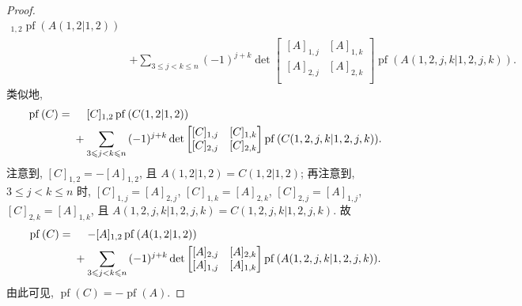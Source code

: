 \begin{proof}
\begin{align*}
        [A]_{1,2}
        \operatorname{pf} {(A({1,2}|{1,2}))}
        \\
             &
        +
        \sum_{3 \leq j < k \leq n}
        {
        (-1)^{j + k}
        \det {
            \begin{bmatrix}
                [A]_{1,j} & [A]_{1,k} \\
                [A]_{2,j} & [A]_{2,k} \\
            \end{bmatrix}
        }
        \operatorname{pf} {(A({1,2,j,k}|{1,2,j,k}))}
        }.
    \end{align*}
    类似地,
    \begin{align*}
        \operatorname{pf} {(C)}
        = {} &
        \hphantom{{} + {}}
        [C]_{1,2}
        \operatorname{pf} {(C({1,2}|{1,2}))}
        \\
             &
        +
        \sum_{3 \leq j < k \leq n}
        {
        (-1)^{j + k}
        \det {
            \begin{bmatrix}
                [C]_{1,j} & [C]_{1,k} \\
                [C]_{2,j} & [C]_{2,k} \\
            \end{bmatrix}
        }
        \operatorname{pf} {(C({1,2,j,k}|{1,2,j,k}))}
        }.
    \end{align*}
    注意到, \([C]_{1,2} = -[A]_{1,2}\),
    且 \(A({1,2}|{1,2}) = C({1,2}|{1,2})\);
    再注意到, \(3 \leq j < k \leq n\) 时,
    \([C]_{1,j} = [A]_{2,j}\),
    \([C]_{1,k} = [A]_{2,k}\),
    \([C]_{2,j} = [A]_{1,j}\),
    \([C]_{2,k} = [A]_{1,k}\),
    且 \(A({1,2,j,k}|{1,2,j,k}) = C({1,2,j,k}|{1,2,j,k})\).
    故
    \begin{align*}
        \operatorname{pf} {(C)}
        = {} &
        \hphantom{{} + {}}
        {-[A]_{1,2}}
        \operatorname{pf} {(A({1,2}|{1,2}))}
        \\
             &
        +
        \sum_{3 \leq j < k \leq n}
        {
        (-1)^{j + k}
        \det {
            \begin{bmatrix}
                [A]_{2,j} & [A]_{2,k} \\
                [A]_{1,j} & [A]_{1,k} \\
            \end{bmatrix}
        }
        \operatorname{pf} {(A({1,2,j,k}|{1,2,j,k}))}
        }.
    \end{align*}
    由此可见, \(\operatorname{pf} {(C)}
    = -\operatorname{pf} {(A)}\).


\end{proof}
